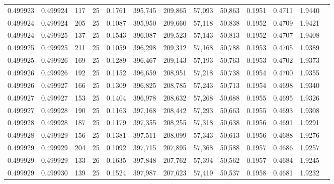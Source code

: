 \begin{tabular}{rrrrrrrrrrrrr}
0.499923 & 0.499924 & 117 &  25 &                                     0.1761 & 395,745 & 209,865 &  57,093 &  50,863 & 0.1951 & 0.4711 & 1.9440 \\
0.499924 & 0.499924 & 205 &  25 &                                     0.1087 & 395,950 & 209,660 &  57,118 &  50,838 & 0.1952 & 0.4709 & 1.9421 \\
0.499924 & 0.499925 & 137 &  25 &                                     0.1543 & 396,087 & 209,523 &  57,143 &  50,813 & 0.1952 & 0.4707 & 1.9408 \\
0.499925 & 0.499925 & 211 &  25 &                                     0.1059 & 396,298 & 209,312 &  57,168 &  50,788 & 0.1953 & 0.4705 & 1.9389 \\
0.499925 & 0.499926 & 169 &  25 &                                     0.1289 & 396,467 & 209,143 &  57,193 &  50,763 & 0.1953 & 0.4702 & 1.9373 \\
0.499926 & 0.499926 & 192 &  25 &                                     0.1152 & 396,659 & 208,951 &  57,218 &  50,738 & 0.1954 & 0.4700 & 1.9355 \\
0.499926 & 0.499927 & 166 &  25 &                                     0.1309 & 396,825 & 208,785 &  57,243 &  50,713 & 0.1954 & 0.4698 & 1.9340 \\
0.499927 & 0.499927 & 153 &  25 &                                     0.1404 & 396,978 & 208,632 &  57,268 &  50,688 & 0.1955 & 0.4695 & 1.9326 \\
0.499927 & 0.499928 & 190 &  25 &                                     0.1163 & 397,168 & 208,442 &  57,293 &  50,663 & 0.1955 & 0.4693 & 1.9308 \\
0.499928 & 0.499928 & 187 &  25 &                                     0.1179 & 397,355 & 208,255 &  57,318 &  50,638 & 0.1956 & 0.4691 & 1.9291 \\
0.499928 & 0.499929 & 156 &  25 &                                     0.1381 & 397,511 & 208,099 &  57,343 &  50,613 & 0.1956 & 0.4688 & 1.9276 \\
0.499929 & 0.499929 & 204 &  25 &                                     0.1092 & 397,715 & 207,895 &  57,368 &  50,588 & 0.1957 & 0.4686 & 1.9257 \\
0.499929 & 0.499929 & 133 &  26 &                                     0.1635 & 397,848 & 207,762 &  57,394 &  50,562 & 0.1957 & 0.4684 & 1.9245 \\
0.499929 & 0.499930 & 139 &  25 &                                     0.1524 & 397,987 & 207,623 &  57,419 &  50,537 & 0.1958 & 0.4681 & 1.9232 \\

\end{tabular}
